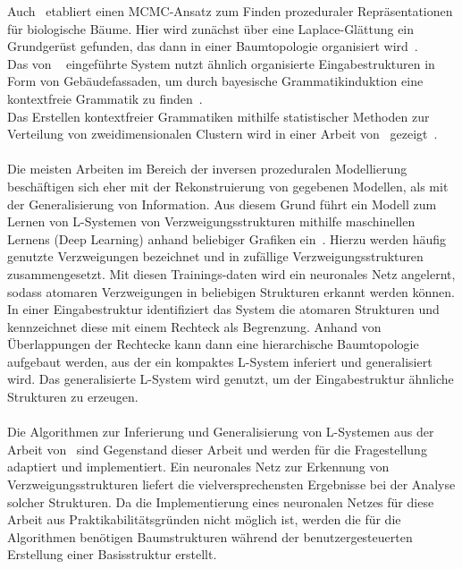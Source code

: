 Auch~\citeauthor{stava_2014} etabliert einen MCMC-Ansatz zum Finden prozeduraler Repräsentationen für biologische Bäume.
Hier wird zunächst über eine Laplace-Glättung ein Grundgerüst gefunden, das dann in einer Baumtopologie organisiert wird~\cite{stava_2014}.\\
Das von ~\citeauthor{martinovic_2013} eingeführte System nutzt ähnlich organisierte Eingabestrukturen in Form von
Gebäudefassaden, um durch bayesische Grammatikinduktion eine kontextfreie Grammatik zu finden~\cite{martinovic_2013}.\\
Das Erstellen kontextfreier Grammatiken mithilfe statistischer Methoden zur Verteilung von zweidimensionalen Clustern
wird in einer Arbeit von~\citeauthor{stava_2010} gezeigt~\cite{stava_2010}.\\~\\
Die meisten Arbeiten im Bereich der inversen prozeduralen Modellierung beschäftigen sich eher mit der Rekonstruierung von
gegebenen Modellen, als mit der Generalisierung von Information.
Aus diesem Grund führt \citeauthor{guo_2020} ein Modell zum Lernen von L-Systemen von Verzweigungsstrukturen mithilfe maschinellen
Lernens (Deep Learning) anhand beliebiger Grafiken ein~\cite{guo_2020}.
Hierzu werden häufig genutzte Verzweigungen bezeichnet und in zufällige Verzweigungsstrukturen zusammengesetzt.
Mit diesen Trainings-daten wird ein neuronales Netz angelernt, sodass atomaren Verzweigungen in beliebigen Strukturen erkannt werden können.
In einer Eingabestruktur identifiziert das System die atomaren Strukturen und kennzeichnet diese mit einem Rechteck als Begrenzung.
Anhand von Überlappungen der Rechtecke kann dann eine hierarchische Baumtopologie aufgebaut werden, aus der ein kompaktes
L-System inferiert und generalisiert wird.
Das generalisierte L-System wird genutzt, um der Eingabestruktur ähnliche Strukturen zu erzeugen.\\~\\
Die Algorithmen zur Inferierung und Generalisierung von L-Systemen aus der Arbeit von~\citeauthor{guo_2020} sind
Gegenstand dieser Arbeit und werden für die Fragestellung adaptiert und implementiert.
Ein neuronales Netz zur Erkennung von Verzweigungsstrukturen liefert die vielversprechensten Ergebnisse bei der Analyse
solcher Strukturen.
Da die Implementierung eines neuronalen Netzes für diese Arbeit aus Praktikabilitätsgründen nicht möglich ist,
werden die für die Algorithmen benötigen Baumstrukturen während der benutzergesteuerten Erstellung einer Basisstruktur
erstellt.